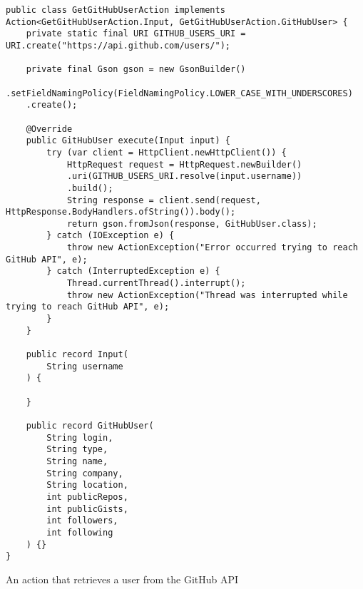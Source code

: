 \begin{listing}[H]
\begin{verbatim}
public class GetGitHubUserAction implements Action<GetGitHubUserAction.Input, GetGitHubUserAction.GitHubUser> {
    private static final URI GITHUB_USERS_URI = URI.create("https://api.github.com/users/");
    
    private final Gson gson = new GsonBuilder()
    .setFieldNamingPolicy(FieldNamingPolicy.LOWER_CASE_WITH_UNDERSCORES)
    .create();
    
    @Override
    public GitHubUser execute(Input input) {
        try (var client = HttpClient.newHttpClient()) {
            HttpRequest request = HttpRequest.newBuilder()
            .uri(GITHUB_USERS_URI.resolve(input.username))
            .build();
            String response = client.send(request, HttpResponse.BodyHandlers.ofString()).body();
            return gson.fromJson(response, GitHubUser.class);
        } catch (IOException e) {
            throw new ActionException("Error occurred trying to reach GitHub API", e);
        } catch (InterruptedException e) {
            Thread.currentThread().interrupt();
            throw new ActionException("Thread was interrupted while trying to reach GitHub API", e);
        }
    }
    
    public record Input(
        String username
    ) {
        
    }
    
    public record GitHubUser(
        String login,
        String type,
        String name,
        String company,
        String location,
        int publicRepos,
        int publicGists,
        int followers,
        int following
    ) {}
}
\end{verbatim}
\caption{An action that retrieves a user from the GitHub API}
\end{listing}

